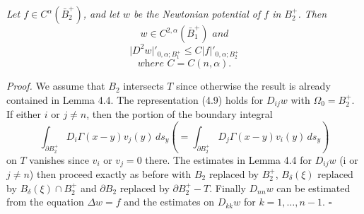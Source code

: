 \medskip

\begin{lemma}\label{gt:lem-newtonian-holder-halfball}
\textit{Let $f\in C^{\alpha}(\bar{B}_2^+)$, and let $w$ be the Newtonian potential of $f$ in $B_2^+$. Then}
\[
w\in C^{2,\alpha}(\bar{B}_1^+) \textit{ and}
\]
\begin{equation}
\tag{4.23}
\lvert D^2w\rvert'_{0,\alpha;B_1^+}\leq C\lvert f\rvert'_{0,\alpha;B_2^+}
\end{equation}
\[
\textit{where }C=C(n,\alpha).
\]

\textit{Proof.} We assume that $B_2$ intersects $T$ since otherwise the result is already
contained in Lemma 4.4. The representation (4.9) holds for $D_{ij}w$ with $\Omega_0=B_2^+$. If
either $i$ or $j\neq n$, then the portion of the boundary integral
\[
\int_{\partial B_2^+} D_i\Gamma(x-y)v_j(y)\,ds_y
\left(
=\int_{\partial B_2^+} D_j\Gamma(x-y)v_i(y)\,ds_y
\right)
\]
on $T$ vanishes since $v_i$ or $v_j=0$ there. The estimates in Lemma 4.4 for $D_{ij}w$
(i or $j\neq n$) then proceed exactly as before with $B_2$ replaced by $B_2^+$, $B_\delta(\xi)$ replaced by
$B_\delta(\xi)\cap B_2^+$ and $\partial B_2$ replaced by $\partial B_2^+-T$. Finally $D_{nn}w$ can be estimated from the
equation $\Delta w=f$ and the estimates on $D_{kk}w$ for $k=1,\ldots,n-1$. $\square$

\medskip

\end{lemma}

